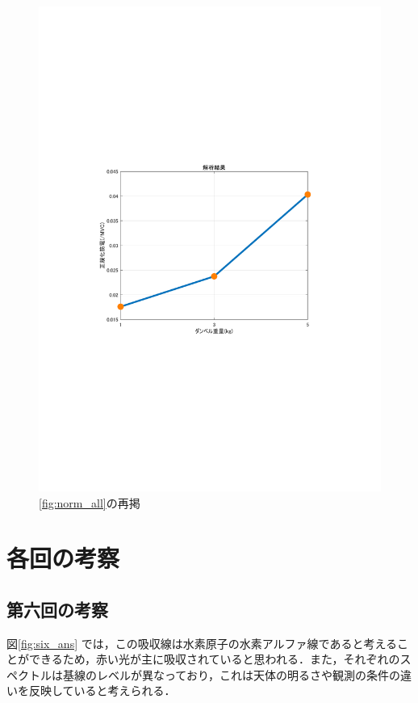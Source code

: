 \documentclass[dvipdfmx, titlepage, t]{jsarticle}
\begin{document}
    \begin{figure}[H]
        \centering
        \includegraphics[trim=90 250 100 250 clip,keepaspectratio, width=\linewidth]{figure/norm_all.pdf}
        \caption{\ref{fig:norm_all}の再掲}
        \label{fig:ten_ans}
    \end{figure}

    \section{各回の考察}
    \subsection{第六回の考察}
    図\ref{fig:six_ans} では，この吸収線は水素原子の水素アルファ線であると考えることができるため，赤い光が主に吸収されていると思われる．また，それぞれのスペクトルは基線のレベルが異なっており，これは天体の明るさや観測の条件の違いを反映していると考えられる．
\end{document}

